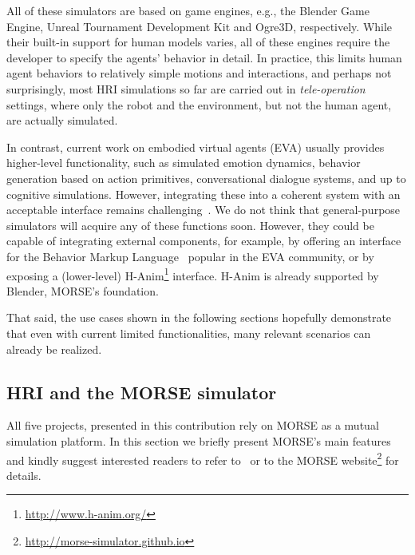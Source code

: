 \documentclass[conference]{IEEEtran}
\begin{document}
All of these simulators are based on game engines, e.g., the Blender Game Engine,
Unreal Tournament Development Kit and Ogre3D, respectively. While their
built-in support for human models varies, all of these engines require the
developer to specify the agents' behavior in detail. In practice, this limits
human agent behaviors to relatively simple motions and interactions, and perhaps
not surprisingly, most HRI simulations so far are carried out in
\emph{tele-operation} settings, where only the robot and the environment, but
not the human agent, are actually simulated.

In contrast, current work on embodied virtual agents (EVA) usually provides 
higher-level functionality, such as simulated emotion dynamics, behavior 
generation based on action primitives, conversational dialogue systems, and
up to cognitive simulations. However, integrating these into a coherent 
system with an acceptable interface remains 
challenging~\cite{gratch2002creating}. We do not think that general-purpose
simulators will acquire any of these functions soon. However, they could be
capable of integrating external components, for example, by offering 
an interface for the Behavior Markup Language~\cite{kopp2006towards} popular
in the EVA community, or by exposing a (lower-level) 
H-Anim\footnote{\url{http://www.h-anim.org/}} interface. H-Anim is already
supported by Blender, MORSE's foundation.

That said, the use cases shown in the following sections hopefully demonstrate that
even with current limited functionalities, many relevant scenarios can already
be realized.

\subsection*{HRI and the MORSE simulator}

All five projects, presented in this contribution rely on MORSE as a mutual
simulation platform. In this section we briefly present MORSE's main features
and kindly suggest interested readers to refer to~\cite{morse_simpar_2012}
or to the MORSE website\footnote{\url{http://morse-simulator.github.io}} for
details.
\end{document}
